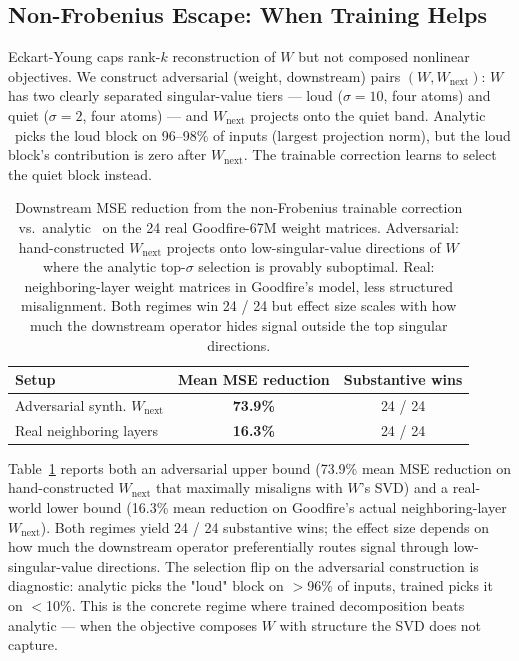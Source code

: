 \subsection{Non-Frobenius Escape: When Training Helps}
\label{sec:non-frobenius-exp}

Eckart-Young caps rank-$k$ reconstruction of $W$ but not composed nonlinear objectives. We construct adversarial (weight, downstream) pairs $(W, W_\text{next})$: $W$ has two clearly separated singular-value tiers --- loud ($\sigma = 10$, four atoms) and quiet ($\sigma = 2$, four atoms) --- and $W_\text{next}$ projects onto the quiet band. Analytic \svdomp\ picks the loud block on 96--98\% of inputs (largest projection norm), but the loud block's contribution is zero after $W_\text{next}$. The trainable correction learns to select the quiet block instead.

\begin{table}[t]
\centering
\small
\begin{tabular}{lcc}
\toprule
Setup & Mean MSE reduction & Substantive wins \\
\midrule
Adversarial synth. $W_\text{next}$ &  \textbf{73.9\%} & 24 / 24 \\
Real neighboring layers            &  \textbf{16.3\%} & 24 / 24 \\
\bottomrule
\end{tabular}
\caption{Downstream MSE reduction from the non-Frobenius trainable correction vs.\ analytic \svdomp\ on the 24 real Goodfire-67M weight matrices. Adversarial: hand-constructed $W_\text{next}$ projects onto low-singular-value directions of $W$ where the analytic top-$\sigma$ selection is provably suboptimal. Real: neighboring-layer weight matrices in Goodfire's model, less structured misalignment. Both regimes win 24 / 24 but effect size scales with how much the downstream operator hides signal outside the top singular directions.}
\label{tab:non-frobenius}
\end{table}

Table~\ref{tab:non-frobenius} reports both an adversarial upper bound (73.9\% mean MSE reduction on hand-constructed $W_\text{next}$ that maximally misaligns with $W$'s SVD) and a real-world lower bound (16.3\% mean reduction on Goodfire's actual neighboring-layer $W_\text{next}$). Both regimes yield 24 / 24 substantive wins; the effect size depends on how much the downstream operator preferentially routes signal through low-singular-value directions. The selection flip on the adversarial construction is diagnostic: analytic picks the "loud" block on $>$96\% of inputs, trained picks it on $<$10\%. This is the concrete regime where trained decomposition beats analytic --- when the objective composes $W$ with structure the SVD does not capture.

